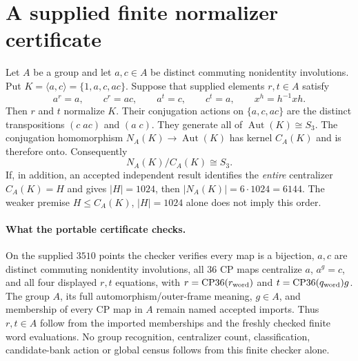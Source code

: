 \documentclass{article}
\begin{document}
\section*{A supplied finite normalizer certificate}
Let $A$ be a group and let $a,c\in A$ be distinct commuting nonidentity
involutions. Put $K=\langle a,c\rangle=\{1,a,c,ac\}$.
Suppose that supplied elements $r,t\in A$ satisfy
\[
 a^r=a,\qquad c^r=ac,\qquad a^t=c,\qquad c^t=a,
 \qquad x^h=h^{-1}xh.
\]
Then $r$ and $t$ normalize $K$. Their conjugation actions on
$\{a,c,ac\}$ are the distinct transpositions $(c\;ac)$ and $(a\;c)$.
They generate all of $\operatorname{Aut}(K)\cong S_3$.
The conjugation homomorphism
$N_A(K)\longrightarrow\operatorname{Aut}(K)$ has kernel $C_A(K)$
and is therefore onto. Consequently
\[
  N_A(K)/C_A(K)\cong S_3.
\]
If, in addition, an accepted independent result identifies the
\emph{entire} centralizer $C_A(K)=H$ and gives $|H|=1024$, then
$|N_A(K)|=6\cdot1024=6144$.
The weaker premise $H\leq C_A(K)$, $|H|=1024$ alone does not imply
this order.

\paragraph{What the portable certificate checks.}
On the supplied $3510$ points the checker verifies every map is a
bijection, $a,c$ are distinct commuting nonidentity involutions,
all $36$ CP maps centralize $a$, $a^g=c$, and all four displayed
$r,t$ equations, with $r=\operatorname{CP36}(r_{\rm word})$ and
$t=\operatorname{CP36}(q_{\rm word})g$.
The group $A$, its full automorphism/outer-frame meaning, $g\in A$,
and membership of every CP map in $A$ remain named accepted imports.
Thus $r,t\in A$ follow from the imported memberships and the freshly
checked finite word evaluations. No group recognition, centralizer
count, classification, candidate-bank action or global census follows
from this finite checker alone.
\end{document}
